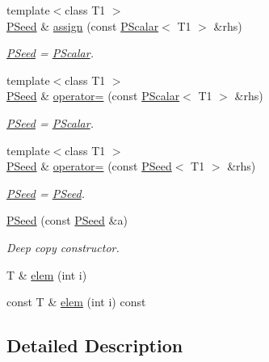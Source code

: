 \begin{DoxyCompactItemize}
{\footnotesize template$<$class T1 $>$ }\\\mbox{\hyperlink{classENSEM_1_1PSeed}{P\+Seed}} \& \mbox{\hyperlink{classENSEM_1_1PSeed_a8d74bd21af23dfb165937c3bb546ea8f}{assign}} (const \mbox{\hyperlink{classENSEM_1_1PScalar}{P\+Scalar}}$<$ T1 $>$ \&rhs)
\begin{DoxyCompactList}\small\item\em \mbox{\hyperlink{classENSEM_1_1PSeed}{P\+Seed}} = \mbox{\hyperlink{classENSEM_1_1PScalar}{P\+Scalar}}. \end{DoxyCompactList}\item 
{\footnotesize template$<$class T1 $>$ }\\\mbox{\hyperlink{classENSEM_1_1PSeed}{P\+Seed}} \& \mbox{\hyperlink{classENSEM_1_1PSeed_aa7d9ec1f6a7cca8ee109c29d75482350}{operator=}} (const \mbox{\hyperlink{classENSEM_1_1PScalar}{P\+Scalar}}$<$ T1 $>$ \&rhs)
\begin{DoxyCompactList}\small\item\em \mbox{\hyperlink{classENSEM_1_1PSeed}{P\+Seed}} = \mbox{\hyperlink{classENSEM_1_1PScalar}{P\+Scalar}}. \end{DoxyCompactList}\item 
{\footnotesize template$<$class T1 $>$ }\\\mbox{\hyperlink{classENSEM_1_1PSeed}{P\+Seed}} \& \mbox{\hyperlink{classENSEM_1_1PSeed_a22c88645227bfddbfea703ed71117795}{operator=}} (const \mbox{\hyperlink{classENSEM_1_1PSeed}{P\+Seed}}$<$ T1 $>$ \&rhs)
\begin{DoxyCompactList}\small\item\em \mbox{\hyperlink{classENSEM_1_1PSeed}{P\+Seed}} = \mbox{\hyperlink{classENSEM_1_1PSeed}{P\+Seed}}. \end{DoxyCompactList}\item 
\mbox{\hyperlink{classENSEM_1_1PSeed_a3a38a0e42c0c2ed2996eff03e32eebdc}{P\+Seed}} (const \mbox{\hyperlink{classENSEM_1_1PSeed}{P\+Seed}} \&a)
\begin{DoxyCompactList}\small\item\em Deep copy constructor. \end{DoxyCompactList}\item 
T \& \mbox{\hyperlink{classENSEM_1_1PSeed_aeed16139a22df65e16fd064b7808c49a}{elem}} (int i)
\item 
const T \& \mbox{\hyperlink{classENSEM_1_1PSeed_aa9151226aec3137be3417bbf36f770aa}{elem}} (int i) const
\end{DoxyCompactItemize}


\subsection{Detailed Description}
